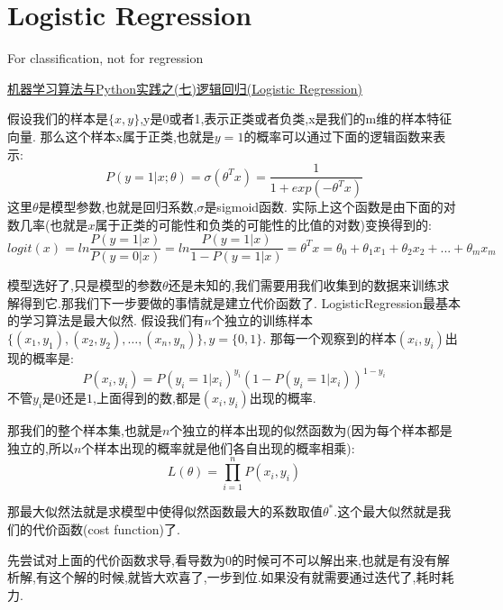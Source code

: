 \section{Logistic Regression}
For classification, not for regression

\href{http://blog.csdn.net/zouxy09/article/details/20319673}{机器学习算法与Python实践之(七)逻辑回归(Logistic Regression)}

假设我们的样本是$\{x, y\}$,y是0或者1,表示正类或者负类,x是我们的m维的样本特征向量.
那么这个样本x属于正类,也就是$y = 1$的概率可以通过下面的逻辑函数来表示:
$$
P(y = 1| x; \theta) = \sigma(\theta^T x) = \frac{1}{1 + exp(- \theta^T x)}
$$
这里$\theta$是模型参数,也就是回归系数,$\sigma$是sigmoid函数.
实际上这个函数是由下面的对数几率(也就是$x$属于正类的可能性和负类的可能性的比值的对数)变换得到的:
$$
log it(x)
= ln \frac{P(y = 1 | x)}{P(y = 0 | x)}
= ln \frac{P(y = 1 | x)}{1 - P(y = 1 | x)}
= \theta^T x
= \theta_0 + \theta_1 x_1 + \theta_2 x_2 + ... + \theta_m x_m
$$

模型选好了,只是模型的参数$\theta$还是未知的,我们需要用我们收集到的数据来训练求解得到它.那我们下一步要做的事情就是建立代价函数了.
LogisticRegression最基本的学习算法是最大似然.
假设我们有$n$个独立的训练样本$\{(x_1, y_1) ,(x_2, y_2), \ldots ,(x_n, y_n)\},y = \{0, 1\}$.
那每一个观察到的样本$(x_i, y_i)$出现的概率是:
$$
P(x_i, y_i) = P(y_i = 1 | x_i)^{y_i} (1 - P(y_i = 1 | x_i))^{1 - y_i}
$$
不管$y_i$是$0$还是$1$,上面得到的数,都是$(x_i, y_i)$出现的概率.

那我们的整个样本集,也就是$n$个独立的样本出现的似然函数为(因为每个样本都是独立的,所以$n$个样本出现的概率就是他们各自出现的概率相乘):
$$
L(\theta)
= \prod_{i = 1}^{n} P(x_i, y_i)
$$

那最大似然法就是求模型中使得似然函数最大的系数取值$\theta^*$.这个最大似然就是我们的代价函数(cost function)了.

先尝试对上面的代价函数求导,看导数为0的时候可不可以解出来,也就是有没有解析解,有这个解的时候,就皆大欢喜了,一步到位.如果没有就需要通过迭代了,耗时耗力.

